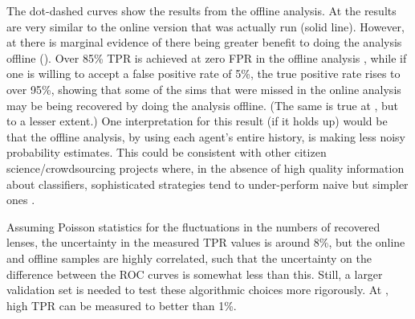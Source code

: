 \documentclass[useAMS,usenatbib,a4paper]{mn2e}
\begin{document}
The dot-dashed curves show the results from the offline analysis. At \StageOne the
results are very similar to the online version that was actually run (solid
line). However, at \StageTwo there is marginal evidence of there being greater
benefit to doing the analysis offline ().
Over 85\% TPR is achieved at zero FPR in the offline analysis , while if one is
willing to accept a false positive rate of 5\%, the true positive rate rises to
over 95\%, showing that some of the sims that were missed in the online analysis
may be being recovered by doing the analysis offline. (The same is true at
\StageOne, but to a lesser extent.) One interpretation for this result (if it holds up)
would be that the offline analysis, by using each agent's entire history, is
making less noisy probability estimates. This could be consistent with
other citizen science/crowdsourcing projects where,
in the absence of high quality information about classifiers,
sophisticated strategies tend to under-perform naive but simpler
ones \citep[][although we note that this rule of thumb seems not to extend
to simple voting in this case!]{Waterhouse}.

Assuming Poisson statistics for the
fluctuations in the numbers of recovered lenses, the uncertainty in the measured
\StageTwo TPR values is around 8\%, but the online and offline samples are
highly correlated, such that the uncertainty on the difference between the ROC
curves is somewhat less than this.
Still, a larger validation set is needed to
test these algorithmic choices more rigorously. At \StageOne, high TPR can be
measured to better than 1\%.
\end{document}
